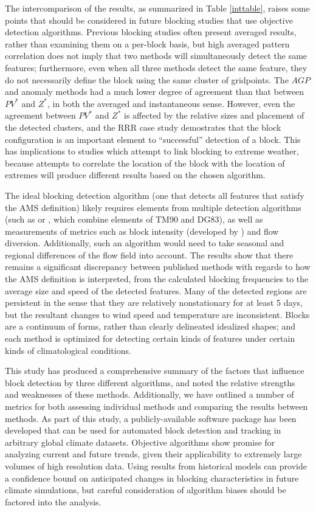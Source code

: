 \documentclass[smallextended]{svjour3}       %
\numberwithin{equation}{section}
\begin{document}
The intercomparison of the results, as summarized in Table \ref{inttable}, raises some points that should be considered in future blocking studies that use objective detection algorithms.   Previous blocking studies often present averaged results, rather than examining them on a per-block basis, but high averaged pattern correlation does not imply that two methods will simultaneously detect the same features; furthermore, even when all three methods detect the same feature, they do not necessarily define the block using the same cluster of gridpoints. The $AGP$ and anomaly methods had a much lower degree of agreement than that between $PV^*$ and $Z^*$, in both the averaged and instantaneous sense. However, even the agreement between $PV^*$ and $Z^*$ is affected by the relative sizes and placement of the detected clusters, and the RRR case study demostrates that the block configuration is an important element to ``successful'' detection of a block. This has implications to studies which attempt to link blocking to extreme weather, because attempts to correlate the location of the block with the location of extremes will produce different results based on the chosen algorithm. 

The ideal blocking detection algorithm (one that detects all features that satisfy the AMS definition) likely requires elements from multiple detection algorithms (such as \cite{dunn-sigouin_evaluation_2012} or \cite{barriopedro_application_2010}, which combine elements of TM90 and DG83), as well as measurements of metrics such as block intensity (developed by \citealt{wiedenmann_climatology_2002}) and flow diversion. Additionally, such an algorithm would need to take seasonal and regional differences of the flow field into account.   The results show that there remains a significant discrepancy between published methods with regards to how the AMS definition is interpreted, from the calculated blocking frequencies to the average size and speed of the detected features. Many of the detected regions are persistent in the sense that they are relatively nonstationary for at least 5 days, but the resultant changes to wind speed and temperature are inconsistent. Blocks are a continuum of forms, rather than clearly delineated idealized shapes; and each method is optimized for detecting certain kinds of features under certain kinds of climatological conditions. 

This study has produced a comprehensive summary of the factors that influence block detection by three different algorithms, and noted the relative strengths and weaknesses of these methods.  Additionally, we have outlined a number of metrics for both assessing individual methods and comparing the results between methods. As part of this study, a publicly-available software package has been developed that can be used for automated block detection and tracking in arbitrary global climate datasets. Objective algorithms show promise for analyzing current and future trends, given their applicability to extremely large volumes of high resolution data. Using results from historical models can provide a confidence bound on anticipated changes in blocking characteristics in future climate simulations, but careful consideration of algorithm biases should be factored into the analysis.
\end{document}
